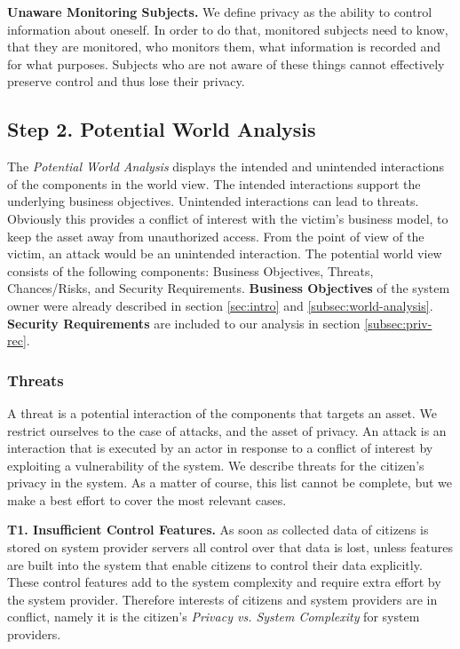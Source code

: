 \documentclass[runningheads,a4paper]{llncs}
\begin{document}
\textbf{Unaware Monitoring Subjects.}
We define privacy as the ability to control information about oneself. 
In order to do that, monitored subjects need to know, that
they are monitored, who monitors them, what information is recorded
and for what purposes.  Subjects who are not aware of these things
cannot effectively preserve control and thus lose their privacy. 

\subsection{Step 2. Potential World Analysis}
\label{subsec:pot-analysis}

The \emph{Potential World Analysis} displays the intended and unintended interactions of the components in the world view. The intended interactions support the underlying business objectives. Unintended interactions can lead to threats. Obviously this provides a conflict of interest with the victim's business model, to keep the asset away from unauthorized access. From the point of view of the victim, an attack would be an unintended interaction. The potential world view consists of the following components: Business Objectives, Threats, Chances/Risks, and Security Requirements. 
\textbf{Business Objectives} of the system owner were already described in section \ref{sec:intro} and \ref{subsec:world-analysis}. \textbf{Security Requirements} are included to our analysis in section \ref{subsec:priv-rec}.


\subsubsection{Threats}

A threat is a potential interaction of the components that targets an asset.
We restrict ourselves to the case of attacks, and the asset of privacy.
An attack is an interaction that is executed by an actor in response to a conflict of interest by exploiting a vulnerability of the system. We describe threats for the citizen's privacy in the system. As a matter of course, this list cannot be complete, but we make a best effort to cover the most relevant cases.

\textbf{T1. Insufficient Control Features.}
As soon as collected data of citizens is stored on system provider servers all control over that data is lost,
unless features are built into the system that enable citizens to control their data explicitly.
These control features add to the system complexity and require extra effort by the system provider.
Therefore interests of citizens and system providers are in conflict, namely it is the citizen's \textit{Privacy vs. System Complexity} for system providers.
\end{document}
